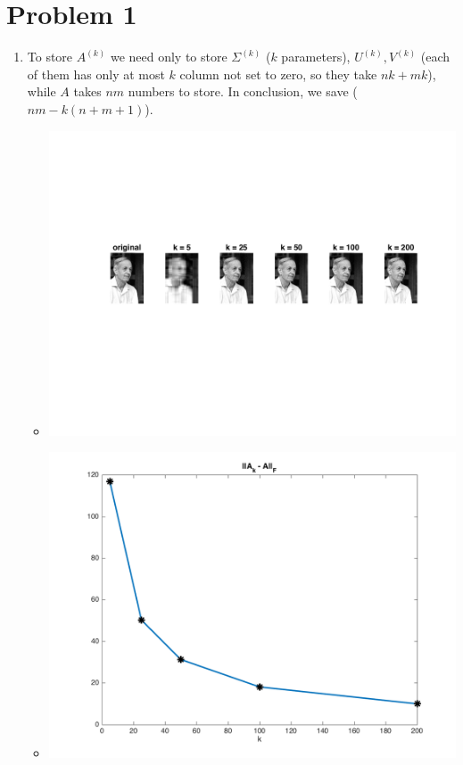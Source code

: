 \documentclass[12pt]{article}
\newenvironment{problem}[1]
{\section*{Problem #1}}{}
\begin{document}
\begin{problem}{1}
\begin{enumerate}
  \item To store $A^{(k)}$ we need only to store $\Sigma^{(k)}$ ($k$ parameters), $U^{(k)}, V^{(k)}$ (each of them has only at most $k$ column not set to zero, so they take $nk + mk$), while $A$ takes $nm$ numbers to store.
    In conclusion, we save ($nm - k(n+m+1)$).
    \begin{itemize}
    \item \includegraphics[scale=.75]{compressed.png}

    \item \includegraphics[scale=.75]{diffnorm.png}



\end{itemize}
\end{enumerate}
\end{problem}
\end{document}
